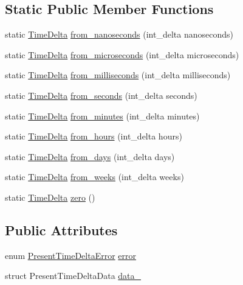 \subsection*{\-Static \-Public \-Member \-Functions}
\begin{DoxyCompactItemize}
\item 
static \hyperlink{structTimeDelta}{\-Time\-Delta} \hyperlink{structTimeDelta_abc1b517c2156b2d9627fd07d42aecb2f}{from\-\_\-nanoseconds} (int\-\_\-delta nanoseconds)
\item 
static \hyperlink{structTimeDelta}{\-Time\-Delta} \hyperlink{structTimeDelta_a32f3fa21ba37d81507383d001f3b704b}{from\-\_\-microseconds} (int\-\_\-delta microseconds)
\item 
static \hyperlink{structTimeDelta}{\-Time\-Delta} \hyperlink{structTimeDelta_a01e0919f444379030aa37559fa13542c}{from\-\_\-milliseconds} (int\-\_\-delta milliseconds)
\item 
static \hyperlink{structTimeDelta}{\-Time\-Delta} \hyperlink{structTimeDelta_aad4311d8580ade36d8c567576630c967}{from\-\_\-seconds} (int\-\_\-delta seconds)
\item 
static \hyperlink{structTimeDelta}{\-Time\-Delta} \hyperlink{structTimeDelta_a244bc3b143bfa760aa2b0cf350cf768c}{from\-\_\-minutes} (int\-\_\-delta minutes)
\item 
static \hyperlink{structTimeDelta}{\-Time\-Delta} \hyperlink{structTimeDelta_a912f6ceafac4b9252a1a5d76033754ea}{from\-\_\-hours} (int\-\_\-delta hours)
\item 
static \hyperlink{structTimeDelta}{\-Time\-Delta} \hyperlink{structTimeDelta_a9bb1a85b6f27ad8488ae06e238d5808e}{from\-\_\-days} (int\-\_\-delta days)
\item 
static \hyperlink{structTimeDelta}{\-Time\-Delta} \hyperlink{structTimeDelta_ae0f0a41d899e62b9d17bc4542c443ec6}{from\-\_\-weeks} (int\-\_\-delta weeks)
\item 
static \hyperlink{structTimeDelta}{\-Time\-Delta} \hyperlink{structTimeDelta_a2dec837a107c5e46e14b9c69557209fa}{zero} ()
\end{DoxyCompactItemize}
\subsection*{\-Public \-Attributes}
\begin{DoxyCompactItemize}
\item 
enum \hyperlink{time-delta_8h_a6090105e9137c36754994cda35937b59}{\-Present\-Time\-Delta\-Error} \hyperlink{structTimeDelta_a212d89d50dc636a4e12ceac5fd9f0bfd}{error}
\item 
struct \-Present\-Time\-Delta\-Data \hyperlink{structTimeDelta_ab88989772d6ab486e1e008238d96eb81}{data\-\_\-}
\end{DoxyCompactItemize}
